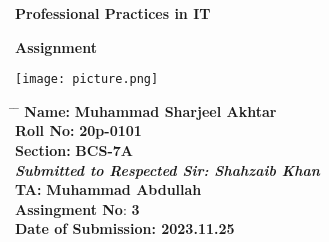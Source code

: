\documentclass[12pt,a4paper]{article}
\title{}
\author{}
\date{}
\begin{document}
	
	\newcommand{\subf}[2]{%
		{\small\begin{tabular}[t]{@{}c@{}}
				#1\\#2
		\end{tabular}}%
	}
	
	\begin{titlepage}
		\begin{center}
			\vspace*{3cm}
			
			\Huge
			\textbf{Professional Practices in IT}
			
			\vspace{0.3cm}
			\Huge
			\textbf{Assignment}
			
			\vspace{0.8cm}
			\large
			
			
			
			\vspace{0.5cm}
			\LARGE
			
			
			\vspace{1.5cm}
			
			\textbf{}
            \texttt{[image: picture.png]}
			
			\vfill
			
			
			
			\vspace{0.8cm}
			
			
			
			\Large
			
			
			
			
		\end{center}
		\Large
		\begin{tabbing}
			\hspace*{1em}\= \hspace*{8em} \= \kill %
			\> \textbf{Name:}\>  \textbf{Muhammad Sharjeel Akhtar} \\
                \> \textbf{Roll No:}\>  \textbf{20p-0101} \\
			\> \textbf{Section:}\>  \textbf{BCS-7A} \\
			\> \textbf{\textit{Submitted to Respected Sir: Shahzaib Khan}}\>  \\
			\> \textbf{TA:}  \> \textbf{Muhammad Abdullah} \\
			\> \textbf{Assingment No}: \textbf{3}  \> \\
			\> \textbf{Date of Submission: 2023.11.25 \> }
		\end{tabbing}
		
	\end{titlepage}
	
\end{document}
